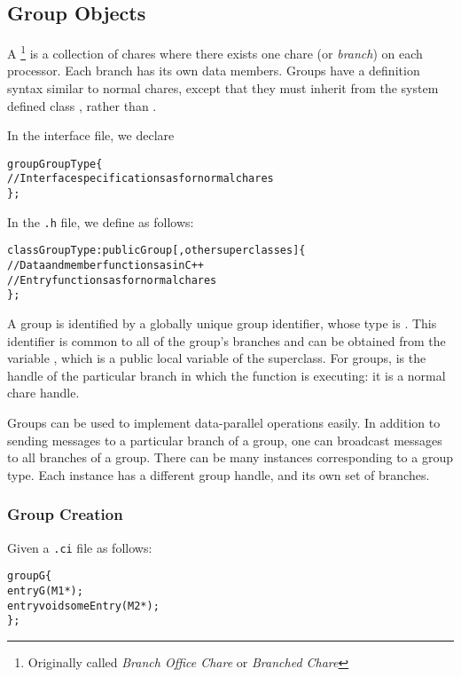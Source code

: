 \subsection{Group Objects}

A \footnote{Originally called {\em Branch Office Chare} or 
{\em Branched Chare}} is a collection of chares where 
there exists one chare (or {\sl branch}) on each
processor.   Each branch has its own data members.  Groups have
a definition syntax similar to normal chares, except that they must
inherit from the system defined class , rather than
.

In the interface file, we declare

\begin{alltt}
 group GroupType \{
   // Interface specifications as for normal chares
 \};
\end{alltt}

In the \texttt{.h} file, we define  as follows:

\begin{alltt}
 class GroupType : public Group [,other superclasses ] \{
  // Data and member functions as in C++
  // Entry functions as for normal chares
 \};
\end{alltt}

A group is identified by a globally unique group identifier, whose type is
. This identifier is common to all of the group's branches and
can be obtained from the variable , which is a public local
variable of the  superclass.  For groups,  is the
handle of the particular branch in which the function is executing: it is a
normal chare handle.

Groups can be used to implement data-parallel operations easily.  In addition
to sending messages to a particular branch of a group, one can broadcast
messages to all branches of a group.  There can be many instances corresponding
to a group type.  Each instance has a different group handle, and its own set
of branches.

\subsubsection{Group Creation}

Given a \texttt{.ci} file as follows:

\begin{alltt}
group G \{
  entry G(M1 *);
  entry void someEntry(M2 *);
\};
\end{alltt}

